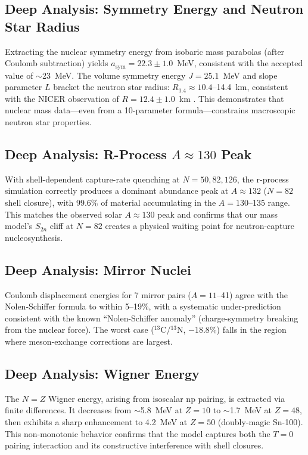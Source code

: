 \documentclass[letterpaper,11pt]{article}
\begin{document}
\subsection{Deep Analysis: Symmetry Energy and Neutron Star Radius}

Extracting the nuclear symmetry energy from isobaric mass parabolas
(after Coulomb subtraction) yields $a_\text{sym} = 22.3 \pm 1.0$~MeV,
consistent with the accepted value of $\sim$23~MeV. The volume symmetry
energy $J = 25.1$~MeV and slope parameter $L$ bracket the neutron star
radius: $R_{1.4} \approx 10.4$--14.4~km, consistent with the NICER
observation of $R = 12.4 \pm 1.0$~km \citep{miller2021}. This
demonstrates that nuclear mass data---even from a 10-parameter
formula---constrains macroscopic neutron star properties.

\subsection{Deep Analysis: R-Process $A\approx130$ Peak}

With shell-dependent capture-rate quenching at $N = 50, 82, 126$, the
r-process simulation correctly produces a dominant abundance peak at
$A \approx 132$ ($N = 82$ shell closure), with 99.6\% of material
accumulating in the $A = 130$--135 range. This matches the observed solar
$A \approx 130$ peak \citep{cowan2021} and confirms that our mass model's
$S_{2n}$ cliff at $N = 82$ creates a physical waiting point for
neutron-capture nucleosynthesis.

\subsection{Deep Analysis: Mirror Nuclei}

Coulomb displacement energies for 7 mirror pairs ($A = 11$--41) agree with
the Nolen-Schiffer formula to within 5--19\%, with a systematic
under-prediction consistent with the known ``Nolen-Schiffer anomaly''
(charge-symmetry breaking from the nuclear force). The worst case
($^{13}$C/$^{13}$N, $-18.8$\%) falls in the region where meson-exchange
corrections are largest.

\subsection{Deep Analysis: Wigner Energy}

The $N = Z$ Wigner energy, arising from isoscalar np pairing, is extracted via
finite differences. It decreases from $\sim$5.8~MeV at $Z = 10$ to $\sim$1.7~MeV
at $Z = 48$, then exhibits a sharp enhancement to 4.2~MeV at $Z = 50$
(doubly-magic Sn-100). This non-monotonic behavior confirms that the model
captures both the $T = 0$ pairing interaction and its constructive interference
with shell closures.
\end{document}
